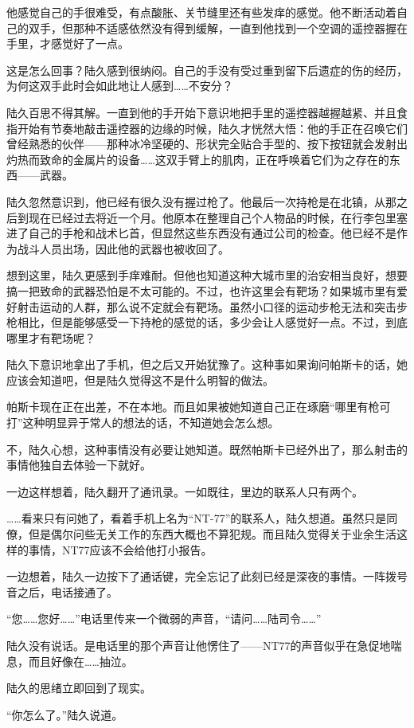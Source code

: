 他感觉自己的手很难受，有点酸胀、关节缝里还有些发痒的感觉。他不断活动着自己的双手，但那种不适感依然没有得到缓解，一直到他找到一个空调的遥控器握在手里，才感觉好了一点。

这是怎么回事？陆久感到很纳闷。自己的手没有受过重到留下后遗症的伤的经历，为何这双手此时会如此地让人感到……不安分？

陆久百思不得其解。一直到他的手开始下意识地把手里的遥控器越握越紧、并且食指开始有节奏地敲击遥控器的边缘的时候，陆久才恍然大悟：他的手正在召唤它们曾经熟悉的伙伴——那种冰冷坚硬的、形状完全贴合手型的、按下按钮就会发射出灼热而致命的金属片的设备……这双手臂上的肌肉，正在呼唤着它们为之存在的东西——武器。

陆久忽然意识到，他已经有很久没有握过枪了。他最后一次持枪是在北镇，从那之后到现在已经过去将近一个月。他原本在整理自己个人物品的时候，在行李包里塞进了自己的手枪和战术匕首，但显然这些东西没有通过公司的检查。他已经不是作为战斗人员出场，因此他的武器也被收回了。

想到这里，陆久更感到手痒难耐。但他也知道这种大城市里的治安相当良好，想要搞一把致命的武器恐怕是不太可能的。不过，也许这里会有靶场？如果城市里有爱好射击运动的人群，那么说不定就会有靶场。虽然小口径的运动步枪无法和突击步枪相比，但是能够感受一下持枪的感觉的话，多少会让人感觉好一点。不过，到底哪里才有靶场呢？

陆久下意识地拿出了手机，但之后又开始犹豫了。这种事如果询问帕斯卡的话，她应该会知道吧，但是陆久觉得这不是什么明智的做法。

帕斯卡现在正在出差，不在本地。而且如果被她知道自己正在琢磨“哪里有枪可打”这种明显异于常人的想法的话，不知道她会怎么想。

不，陆久心想，这种事情没有必要让她知道。既然帕斯卡已经外出了，那么射击的事情他独自去体验一下就好。

一边这样想着，陆久翻开了通讯录。一如既往，里边的联系人只有两个。

……看来只有问她了，看着手机上名为“NT-77”的联系人，陆久想道。虽然只是同僚，但是偶尔问些无关工作的东西大概也不算犯规。而且陆久觉得关于业余生活这样的事情，NT77应该不会给他打小报告。

一边想着，陆久一边按下了通话键，完全忘记了此刻已经是深夜的事情。一阵拨号音之后，电话接通了。

“您……您好……”电话里传来一个微弱的声音，“请问……陆司令……”

陆久没有说话。是电话里的那个声音让他愣住了——NT77的声音似乎在急促地喘息，而且好像在……抽泣。

陆久的思绪立即回到了现实。

“你怎么了。”陆久说道。

